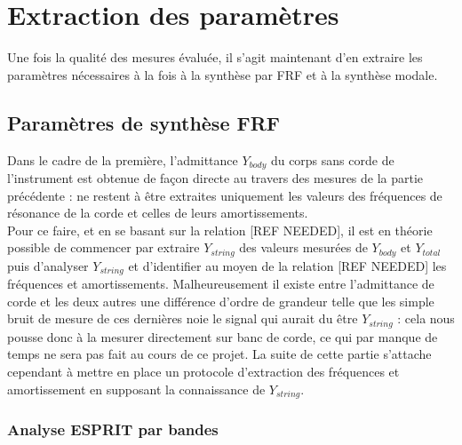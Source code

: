 \section{Extraction des paramètres}

Une fois la qualité des mesures évaluée, il s'agit maintenant d'en extraire les paramètres nécessaires à la fois à la synthèse par FRF et à la synthèse modale.

\subsection{Paramètres de synthèse FRF}

Dans le cadre de la première, l'admittance $Y_{body}$ du corps sans corde de l'instrument est obtenue de façon directe au travers des mesures de la partie précédente : ne restent à être extraites uniquement les valeurs des fréquences de résonance de la corde et celles de leurs amortissements.\\

Pour ce faire, et en se basant sur la relation [REF NEEDED], il est en théorie possible de commencer par extraire $Y_{string}$ des valeurs mesurées de $Y_{body}$ et $Y_{total}$ puis d'analyser $Y_{string}$ et d'identifier au moyen de la relation [REF NEEDED] les fréquences et amortissements. Malheureusement il existe entre l'admittance de corde et les deux autres une différence d'ordre de grandeur telle que les simple bruit de mesure de ces dernières noie le signal qui aurait du être $Y_{string}$ : cela nous pousse donc à la mesurer directement sur banc de corde, ce qui par manque de temps ne sera pas fait au cours de ce projet. La suite de cette partie s'attache cependant à mettre en place un protocole d'extraction des fréquences et amortissement en supposant la connaissance de $Y_{string}$.\\

\subsubsection{Analyse ESPRIT par bandes}
\label{esprit}


